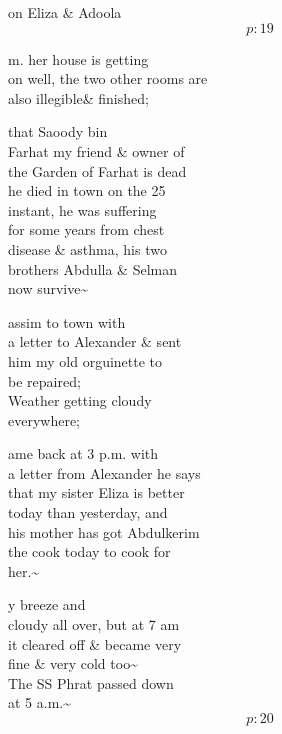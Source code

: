\documentclass{report}
\begin{document}
	\par{
 	on Eliza \& Adoola\ \\
  \[p: 19 \]

	}




	\par{
 	m. her house is getting\ \\on well, the two other rooms are\ \\also \lbrack illegible\rbrack \& finished;\ \\
	}

	\par{
 	that Saoody bin\ \\Farhat my friend \& owner of\ \\the Garden of Farhat is dead\ \\he died in town on the 25\ \\instant, he was suffering\ \\for some years from chest\ \\disease \& asthma, his two\ \\brothers Abdulla \& Selman\ \\now survive\~{}\ \\
	}

	\par{
 	assim to town with\ \\a letter to Alexander \& sent\ \\him my old orguinette to\ \\be repaired;\ \\Weather getting cloudy\ \\everywhere;\ \\
	}

	\par{
 	ame back at 3 p.m. with\ \\a letter from Alexander he says\ \\that my sister Eliza is better\ \\today than yesterday, and\ \\his mother has got Abdulkerim\ \\the cook today to cook for\ \\her.\~{}\ \\
	}


	\par{
 	y breeze and\ \\cloudy all over, but at 7 am\ \\it cleared off \& became very\ \\fine \& very cold too\~{}\ \\The SS Phrat passed down\ \\at 5 a.m.\~{}\ \\
  \[p: 20 \]

	}
\end{document}
